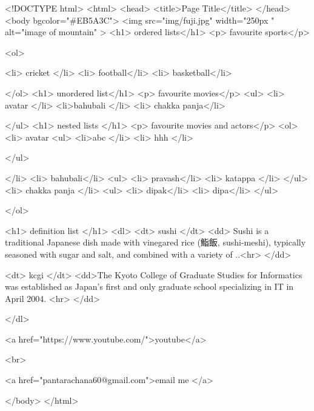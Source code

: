 <!DOCTYPE html>
<html>
<head>
<title>Page Title</title>
</head>
<body bgcolor="#EB5A3C">
<img src="img/fuji.jpg" width="250px " alt="image of mountain" >
<h1> ordered lists</h1>
<p> favourite sports</p>

<ol>

<li> cricket </li>
<li> football</li>
<li> basketball</li>

</ol>
<h1> unordered list</h1>
<p> favourite movies</p>
<ul>
<li> avatar </li>
<li>bahubali </li>
<li> chakka panja</li>

</ul>
<h1> nested lists </h1>
<p> favourite movies and actors</p>
<ol>
<li> avatar
<ul>
<li>abc  </li>
<li> hhh </li>

</ul>

</li>
<li> bahubali</li>
<ul>
<li> pravash</li>
<li> katappa </li>
</ul>
<li> chakka panja </li>
<ul>
<li> dipak</li>
<li> dipa</li>
</ul>

</ol>

<h1> definition list </h1>
<dl>
    <dt>  sushi </dt>
    <dd> Sushi is a traditional Japanese dish made with vinegared rice (鮨飯, sushi-meshi), typically seasoned with sugar and salt, and combined with a variety of ..<hr> </dd>
    
    <dt> kcgi </dt>
    <dd>The Kyoto College of Graduate Studies for Informatics was established as Japan's first and only graduate school specializing in IT in April 2004. <hr> </dd>



</dl>

<a href="https://www.youtube.com/">youtube</a>

<br>

<a href="pantarachana60@gmail.com">email me </a>





</body>
</html>


